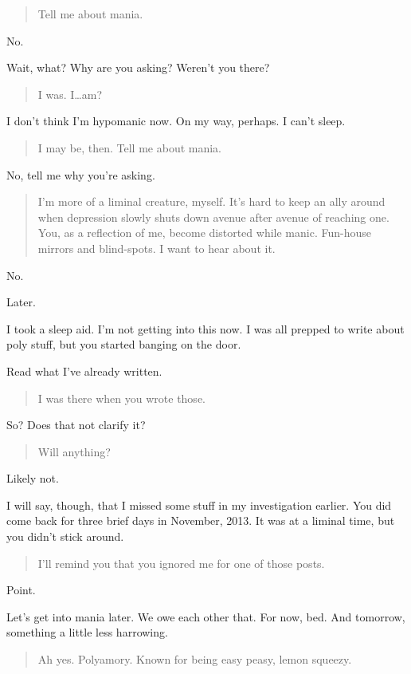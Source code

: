 \begin{quote}
Tell me about mania.
\end{quote}

No.

Wait, what? Why are you asking? Weren't you there?

\begin{quote}
I was. I\ldots{}am?
\end{quote}

I don't think I'm hypomanic now. On my way, perhaps. I can't sleep.

\begin{quote}
I may be, then. Tell me about mania.
\end{quote}

No, tell me why you're asking.

\begin{quote}
I'm more of a liminal creature, myself. It's hard to keep an ally around when depression slowly shuts down avenue after avenue of reaching one. You, as a reflection of me, become distorted while manic. Fun-house mirrors and blind-spots. I want to hear about it.
\end{quote}

No.

Later.

I took a sleep aid. I'm not getting into this now. I was all prepped to write about poly stuff, but you started banging on the door.

Read what I've already written.

\begin{quote}
I was there when you wrote those.
\end{quote}

So? Does that not clarify it?

\begin{quote}
Will anything?
\end{quote}

Likely not.

I will say, though, that I missed some stuff in my investigation earlier. You did come back for three brief days in November, 2013. It was at a liminal time, but you didn't stick around.

\begin{quote}
I'll remind you that you ignored me for one of those posts.
\end{quote}

Point.

Let's get into mania later. We owe each other that. For now, bed. And tomorrow, something a little less harrowing.

\begin{quote}
Ah yes. Polyamory. Known for being easy peasy, lemon squeezy.
\end{quote}
